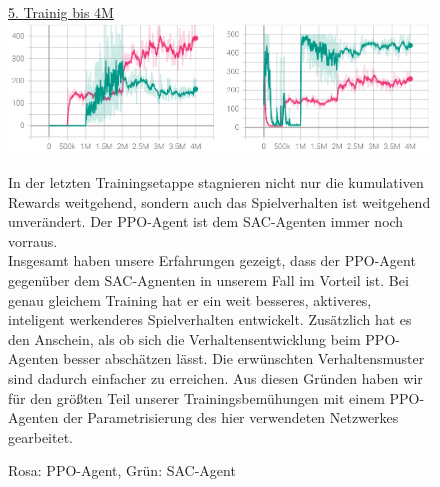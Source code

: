 \begin{figure} [h]
\underline{5. Trainig bis 4M} \\
\includegraphics[width=\textwidth]{images/centered2_erg}
\caption{Rosa: PPO-Agent, Grün: SAC-Agent}
In der letzten Trainingsetappe stagnieren nicht nur die kumulativen Rewards weitgehend, sondern auch das Spielverhalten ist weitgehend unverändert. Der PPO-Agent ist dem SAC-Agenten immer noch vorraus. \\
Insgesamt haben unsere Erfahrungen gezeigt, dass der PPO-Agent gegenüber dem SAC-Agnenten in unserem Fall im Vorteil ist. Bei genau gleichem Training hat er ein weit besseres, aktiveres, inteligent werkenderes Spielverhalten entwickelt. Zusätzlich hat es den Anschein, als ob sich die Verhaltensentwicklung beim PPO-Agenten besser abschätzen lässt. Die erwünschten Verhaltensmuster sind dadurch einfacher zu erreichen. Aus diesen Gründen haben wir für den größten Teil unserer Trainingsbemühungen mit einem PPO-Agenten der Parametrisierung des hier verwendeten Netzwerkes gearbeitet.
\end{figure}
